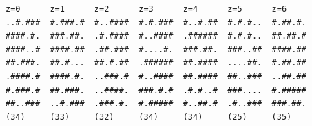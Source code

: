 \begin{verbatim}
z=0      z=1      z=2      z=3      z=4      z=5      z=6    
..#.###  #.###.#  #..####  #.#.###  #..#.##  #.#.#..  #.##.#.
####.#.  ###.##.  .#.####  #..####  .######  #.#.#..  ##.##.#
####..#  ####.##  .##.###  #....#.  ###.##.  ###..##  ####.##
##.###.  ##.#...  ##.#.##  .######  ##.####  ....##.  #.##.##
.####.#  ####.#.  ..###.#  #..####  ##.####  ##..###  ..##.##
#.###.#  ##.###.  ..####.  ###.#.#  .#.#..#  ###....  #.#####
##..###  ..#.###  .###.#.  #.#####  #..##.#  .#..###  ###.##.
(34)     (33)     (32)     (34)     (34)     (25)     (35)   
\end{verbatim}